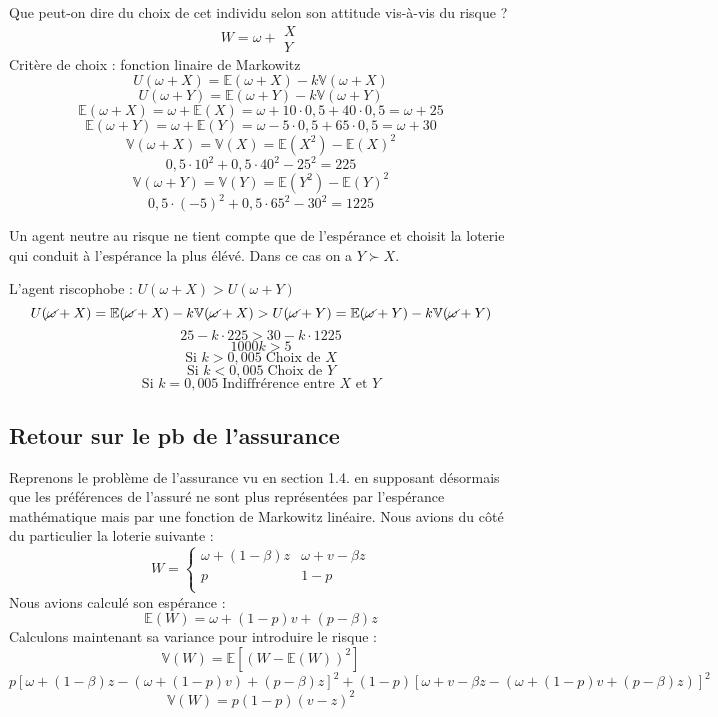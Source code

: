 \documentclass[a4paper, 12pt]{report}
\begin{document}
Que peut-on dire du choix de cet individu selon son attitude vis-à-vis du risque ?
$$
W=\omega + \begin{matrix}
	X \\
	Y
\end{matrix}
$$
Critère  de choix : fonction linaire de Markowitz
$$
U(\omega+X)=\mathbb{E}(\omega+X)-k\mathbb{V}(\omega+X)
$$
$$
U(\omega+Y)=\mathbb{E}(\omega+Y)-k\mathbb{V}(\omega+Y)
$$
$$
\mathbb{E}(\omega+X)=\omega+\mathbb{E}(X)=\omega+10\cdot0,5+40\cdot0,5=\omega+25
$$
$$
\mathbb{E}(\omega+Y)=\omega+\mathbb{E}(Y)=\omega-5\cdot0,5+65\cdot0,5=\omega+30
$$
$$
\mathbb{V}(\omega+X)=\mathbb{V}(X)=\mathbb{E}(X^2)-\mathbb{E}(X)^2
$$
$$
0,5\cdot10^2+0,5\cdot40^2-25^2=225
$$
$$
\mathbb{V}(\omega+Y)=\mathbb{V}(Y)=\mathbb{E}(Y^2)-\mathbb{E}(Y)^2
$$
$$
0,5\cdot(-5)^2+0,5\cdot65^2-30^2=1225
$$

Un agent neutre au risque ne tient compte que de l'espérance et choisit la loterie qui conduit à l'espérance la plus élévé. Dans ce cas on a $Y \succ X$. 

L'agent riscophobe : $U(\omega+X) > U(\omega+Y)$
$$
U(\cancel{\omega}+X)=\mathbb{E}(\cancel{\omega}+X)-k\mathbb{V}(\cancel{\omega}+X)>U(\cancel{\omega}+Y)=\mathbb{E}(\cancel{\omega}+Y)-k\mathbb{V}(\cancel{\omega}+Y)
$$
$$
25-k\cdot225>30-k\cdot1225
$$
$$
1000k>5
$$
$$
\text{Si }k>0,005\; \text{Choix de $X$}
$$
$$
\text{Si }k<0,005\; \text{Choix de $Y$}
$$
$$
\text{Si }k = 0,005\; \text{Indiffrérence entre $X$ et $Y$}
$$

\subsection{Retour sur le pb de l'assurance}

Reprenons le problème de l'assurance vu en section 1.4. en supposant désormais que les préférences de l'assuré ne sont plus représentées par l'espérance mathématique mais par une fonction de Markowitz linéaire. Nous avions du côté du particulier la loterie suivante :
$$
W= \left\{\begin{matrix}
	\omega + (1-\beta)z& \omega + v -\beta z \\
	p & 1-p \\
\end{matrix}\right.
$$
Nous avions calculé son espérance :
$$
\mathbb{E}(W)=\omega+(1-p)v+(p-\beta)z
$$
Calculons maintenant sa variance pour introduire le risque :
$$
\mathbb{V}(W)=\mathbb{E}\left[(W-\mathbb{E}(W))^2\right]
$$
$$
p[\omega+(1-\beta)z-(\omega+(1-p)v)+(p-\beta)z]^2+(1-p)[\omega+v-\beta z-(\omega+(1-p)v+(p-\beta)z)]^2
$$
$$
\mathbb{V}(W)=p(1-p)(v-z)^2
$$
\end{document}
